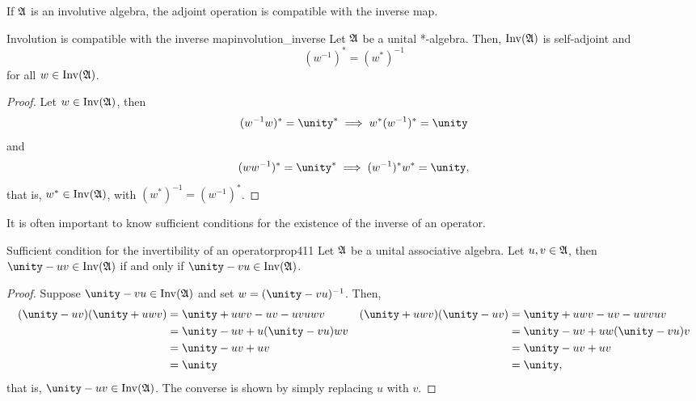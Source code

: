 If \(\mathfrak{A}\) is an involutive algebra, the adjoint operation is compatible with the inverse map.
\begin{proposition}{Involution is compatible with the inverse map}{involution_inverse}
    Let \(\mathfrak{A}\) be a unital *-algebra. Then, \(\operatorname{Inv}(\mathfrak{A})\) is self-adjoint and
    \begin{equation*}
        (w^{-1})^* = (w^*)^{-1}
    \end{equation*}
    for all \(w \in \operatorname{Inv}(\mathfrak{A})\).
\end{proposition}
\begin{proof}
    Let \(w \in \operatorname{Inv}(\mathfrak{A})\), then
    \begin{equation*}
        (w^{-1}w)^* = \unity^* \implies w^* (w^{-1})^* = \unity
    \end{equation*}
    and
    \begin{equation*}
        (ww^{-1})^* = \unity^* \implies (w^{-1})^* w^* = \unity,
    \end{equation*}
    that is, \(w^* \in \operatorname{Inv}(\mathfrak{A})\), with \((w^*)^{-1} = (w^{-1})^*\).
\end{proof}

It is often important to know sufficient conditions for the existence of the inverse of an operator.
\begin{proposition}{Sufficient condition for the invertibility of an operator}{prop411}
    Let \(\mathfrak{A}\) be a unital associative algebra. Let \(u, v \in \mathfrak{A}\), then \(\unity - uv \in \invertible{\algebra{A}}\) if and only if \(\unity - vu \in \invertible{\algebra{A}}\).
\end{proposition}
\begin{proof}
    Suppose \(\unity - vu \in \invertible{\algebra{A}}\) and set \(w = (\unity - vu)^{-1}\). Then,
    \begin{align*}
        (\unity - uv)(\unity + uwv) &= \unity + uwv - uv - uvuwv&
        (\unity + uwv)(\unity - uv) &= \unity + uwv - uv - uwvuv\\
                                    &= \unity - uv + u(\unity - vu)wv&
                                    &= \unity - uv + uw(\unity - vu)v\\
                                    &= \unity - uv + uv&
                                    &= \unity - uv + uv\\
                                    &= \unity&
                                    &= \unity,
    \end{align*}
    that is, \(\unity - uv \in \invertible{\algebra{A}}\). The converse is shown by simply replacing \(u\) with \(v\).
\end{proof}

